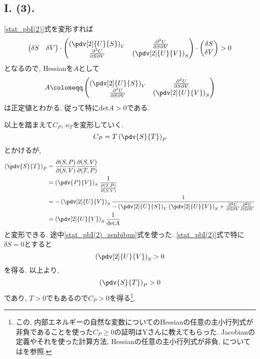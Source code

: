 \subsection*{I. (3). }
\eqref{stat_pbI(2)}式を変形すれば
\begin{equation}
  \begin{pmatrix}
    \delta S&\delta V
  \end{pmatrix}
  \cdot
  \begin{pmatrix}
    \left( \pdv[2]{U}{S} \right)_V&\frac{\partial^2 U}{\partial S \partial V}\\
    \frac{\partial^2 U}{\partial S \partial V}&\left( \pdv[2]{U}{V} \right)_S
  \end{pmatrix}
  \cdot
  \begin{pmatrix}
    \delta S\\
    \delta V
  \end{pmatrix}
  >
  0
\end{equation}
となるので, Hessianを$A$として
\begin{equation}
  A\coloneqq 
    \begin{pmatrix}
    \left( \pdv[2]{U}{S} \right)_V&\frac{\partial^2 U}{\partial S \partial V}\\
    \frac{\partial^2 U}{\partial S \partial V}&\left( \pdv[2]{U}{V} \right)_S
  \end{pmatrix}
\end{equation}
は正定値とわかる. 
従って特に$\text{det}A>0$である. 

以上を踏まえて$C_P$, $\kappa_T$を変形していく. 
\begin{equation}
  C_P=T\left( \pdv{S}{T} \right)_P
\end{equation}
とかけるが, 
\begin{align*}
  \left( \pdv{S}{T} \right)_P
  &=\frac{\partial (S,P)}{\partial (S,V)}\frac{\partial (S,V)}{\partial (T,P)}\\
  &=\left( \pdv{P}{V} \right)_S\frac{1}{\frac{\partial (T,P)}{\partial (S,V)}}\\
  &=-\left( \pdv[2]{U}{V} \right)_S\frac{1}{-\left( \pdv[2]{U}{S} \right)_V\left( \pdv[2]{U}{V} \right)_S+\frac{\partial^2 U}{\partial S\partial V}\frac{\partial^2 U}{\partial S\partial V}}\\
  &=\left( \pdv[2]{U}{V} \right)_S\frac{1}{\text{det}{A}}
\end{align*}
と変形できる. 
途中\eqref{stat_pbI(2)_zenbibun}式を使った. 
\eqref{stat_pbI(2)}式で特に$\delta S=0$とすると
\begin{equation}
  \left( \pdv[2]{U}{V} \right)_S>0
\end{equation}
を得る. 
以上より, 
\begin{equation}
  \left( \pdv{S}{T} \right)_P>0
\end{equation}
であり, $T>0$でもあるので$C_P>0$を得る\footnote{この, 内部エネルギーの自然な変数についてのHessianの任意の主小行列式が非負であることを使った$C_P\geq 0$の証明はYさんに教えてもらった. Jacobianの定義やそれを使った計算方法, Hessianの任意の主小行列式が非負, については\cite{shimizu_thermo_II}を参照. }. 

